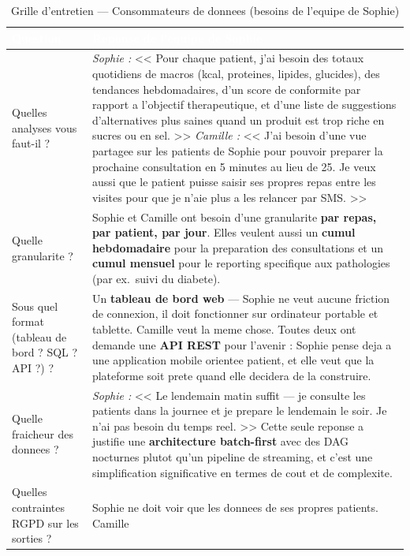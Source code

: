 \documentclass[a4paper,11pt,oneside,openany]{report}
\newcommand{\rgpd}{RGPD}
\begin{document}
\begin{table}[H]
\centering
\caption{Grille d'entretien --- Consommateurs de donnees (besoins de l'equipe de Sophie)}
\label{tab:grid-cons}
\begin{tabularx}{\textwidth}{L{4cm} X}
\toprule
{}
\textcolor{white}{\textbf{Question}} & \textcolor{white}{\textbf{Reponse de l'equipe de Sophie}} \\
\midrule
Quelles analyses vous faut-il ? &
\textit{Sophie :} << Pour chaque patient, j'ai besoin des totaux
quotidiens de macros (kcal, proteines, lipides, glucides), des
tendances hebdomadaires, d'un score de conformite par rapport a
l'objectif therapeutique, et d'une liste de suggestions d'alternatives
plus saines quand un produit est trop riche en sucres ou en sel. >>
\textit{Camille :} << J'ai besoin d'une vue partagee sur les patients
de Sophie pour pouvoir preparer la prochaine consultation en 5 minutes
au lieu de 25. Je veux aussi que le patient puisse saisir ses propres
repas entre les visites pour que je n'aie plus a les relancer par SMS. >>
\\
\addlinespace
Quelle granularite ? &
Sophie et Camille ont besoin d'une granularite \textbf{par repas,
par patient, par jour}. Elles veulent aussi un \textbf{cumul
hebdomadaire} pour la preparation des consultations et un
\textbf{cumul mensuel} pour le reporting specifique aux pathologies
(par ex.\ suivi du diabete).
\\
\addlinespace
Sous quel format (tableau de
bord ? SQL ? API ?) ? &
Un \textbf{tableau de bord web} --- Sophie ne veut aucune friction
de connexion, il doit fonctionner sur ordinateur portable et
tablette. Camille veut la meme chose. Toutes deux ont demande une
\textbf{API REST} pour l'avenir : Sophie pense deja a une
application mobile orientee patient, et elle veut que la plateforme
soit prete quand elle decidera de la construire.
\\
\addlinespace
Quelle fraicheur des donnees ? &
\textit{Sophie :} << Le lendemain matin suffit --- je consulte les
patients dans la journee et je prepare le lendemain le soir. Je n'ai
pas besoin du temps reel. >> Cette seule reponse a justifie une
\textbf{architecture batch-first} avec des DAG nocturnes plutot qu'un
pipeline de streaming, et c'est une simplification significative en
termes de cout et de complexite.
\\
\addlinespace
Quelles contraintes \rgpd{}
sur les sorties ? &
Sophie ne doit voir que les donnees de ses propres patients. Camille

\end{tabularx}
\end{table}
\end{document}
